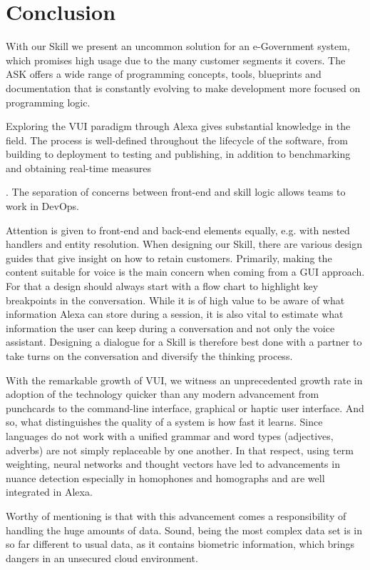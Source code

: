 \section{Conclusion}


With our Skill we present an uncommon solution for an e-Government system, which promises high usage due to the many customer segments it covers.
The ASK offers a wide range of programming concepts, tools, blueprints and documentation that is constantly evolving to make development more focused  on programming logic.

Exploring the VUI paradigm through Alexa gives substantial knowledge in the field. The process is well-defined throughout the lifecycle of the software, from building to deployment to testing and publishing, in addition to benchmarking and obtaining real-time measures


.
The separation of concerns between front-end and skill logic allows teams to work in DevOps.


Attention is given to front-end and back-end elements equally, e.g. with nested handlers and entity resolution.
When designing our Skill, there are various design guides that give insight on how to retain customers. Primarily, making the content suitable for voice is the main concern when coming from a GUI approach. %
For that a design should always start with a flow chart to highlight key breakpoints in the conversation. While it is of high value to be aware of what information Alexa can store during a session, it is also vital to estimate what information the user can keep during a conversation and not only the voice assistant.
Designing a dialogue for a Skill is therefore best done with a partner to take turns on the conversation and diversify the thinking process. %

With the remarkable growth of VUI, we witness an unprecedented growth rate in adoption of the technology quicker than any modern advancement from punchcards to the command-line interface, graphical or haptic user interface.
And so, what distinguishes the quality of a %
system is %
how fast it learns.
Since languages do not work with a unified grammar and word types (adjectives, adverbs) are not simply replaceable by one another.
In that respect, using term weighting, neural networks and thought vectors have led to advancements in nuance detection especially in homophones and homographs and are well integrated in Alexa.

Worthy of mentioning is that with this advancement comes a responsibility of handling the huge amounts of data. Sound, being the most complex data set is in so far different to usual data, as it contains biometric information, which brings dangers in an unsecured cloud environment.

